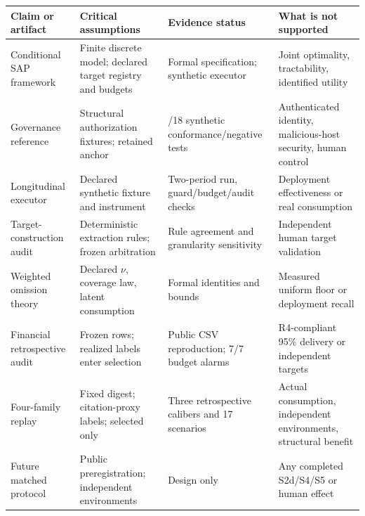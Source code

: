 \documentclass[
  11pt]{article}
\begin{document}
\begin{longtable}[]{@{}
  >{\raggedright\arraybackslash}p{}
  >{\raggedright\arraybackslash}p{}
  >{\raggedright\arraybackslash}p{}
  >{\raggedright\arraybackslash}p{}@{}}
\toprule\noalign{}
\begin{minipage}[b]{\linewidth}\raggedright
Claim or artifact
\end{minipage} & \begin{minipage}[b]{\linewidth}\raggedright
Critical assumptions
\end{minipage} & \begin{minipage}[b]{\linewidth}\raggedright
Evidence status
\end{minipage} & \begin{minipage}[b]{\linewidth}\raggedright
What is not supported
\end{minipage} \\
\midrule\noalign{}
\endhead
\bottomrule\noalign{}
\endlastfoot
Conditional SAP framework & Finite discrete model; declared target
registry and budgets & Formal specification; synthetic executor & Joint
optimality, tractability, identified utility \\
Governance reference & Structural authorization fixtures; retained
anchor & 18/18 synthetic conformance/negative tests & Authenticated
identity, malicious-host security, human control \\
Longitudinal executor & Declared synthetic fixture and instrument &
Two-period run, guard/budget/audit checks & Deployment effectiveness or
real consumption \\
Target-construction audit & Deterministic extraction rules; frozen
arbitration & Rule agreement and granularity sensitivity & Independent
human target validation \\
Weighted omission theory & Declared \(\nu\), coverage law, latent
consumption & Formal identities and bounds & Measured uniform floor or
deployment recall \\
Financial retrospective audit & Frozen rows; realized labels enter
selection & Public CSV reproduction; 7/7 budget alarms & R4-compliant
95\% delivery or independent targets \\
Four-family replay & Fixed digest; citation-proxy labels; selected only
& Three retrospective calibers and 17 scenarios & Actual consumption,
independent environments, structural benefit \\
Future matched protocol & Public preregistration; independent
environments & Design only & Any completed S2d/S4/S5 or human effect \\
\end{longtable}
\end{document}
